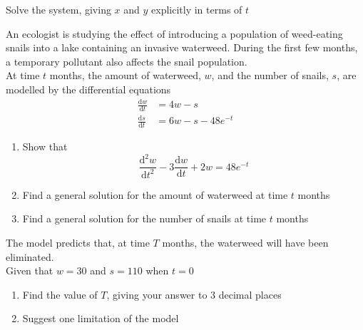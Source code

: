 \documentclass[leqno]{article}
\begin{document}
\begin{enumerate}[
  label=\textbf{\arabic*.},
  leftmargin=*,
  topsep=0pt,
  partopsep=0pt,
  parsep=0pt
]
Solve the system, giving $x$ and $y$ explicitly in terms of $t$  \\

\newpage

\questionitem

An ecologist is studying the effect of introducing a population of weed-eating snails into a lake containing an invasive waterweed. During the first few months, a temporary pollutant also affects the snail population. \\

At time $t$ months, the amount of waterweed, $w$, and the number of snails, $s$, are modelled by the differential equations \\
\begin{align*}
\frac{\mathrm{d}w}{\mathrm{d}t}&=4w-s \\[5pt]
\frac{\mathrm{d}s}{\mathrm{d}t}&=6w-s-48e^{-t}
\end{align*}

\begin{enumerate}[label=\textbf{(\alph*)}]
  \item Show that
  \[\frac{\mathrm{d}^2 w}{\mathrm{d}t^2}-3\frac{\mathrm{d}w}{\mathrm{d}t}+2w=48e^{-t}\]
  \item Find a general solution for the amount of waterweed at time $t$ months  \\
  \item Find a general solution for the number of snails at time $t$ months  \\
\end{enumerate}
The model predicts that, at time $T$ months, the waterweed will have been eliminated. \\
Given that $w=30$ and $s=110$ when $t=0$ \\
\begin{enumerate}[label=\textbf{(\alph*)}, resume]
  \item Find the value of $T$, giving your answer to 3 decimal places  \\
  \item Suggest one limitation of the model  \\
\end{enumerate}

\newpage

\questionitem


\end{enumerate}
\end{document}
